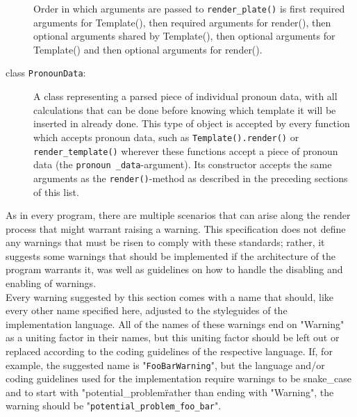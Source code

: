 \documentclass{article}
\newcounter{subsubsubsection}[subsubsection]
\begin{document}
\begin{description}
                                                     Order in which arguments are passed to \texttt{render\_plate()} is first required arguments for Template(), then required arguments for render(), then optional arguments shared by Template(), then optional arguments for Template() and then optional arguments for render().
        \item[class \texttt{PronounData}:] A class representing a parsed piece of individual pronoun data, with all calculations that can be done before knowing which template it will be inserted in already done.
                                            This type of object is accepted by every function which accepts pronoun data, such as \texttt{Template().render()} or \texttt{render\_template()} wherever these functions accept a piece of pronoun data (the \texttt{pronoun \_data}-argument).
                                            Its constructor accepts the same arguments as the  \texttt{render()}-method as described in the preceding sections of this list.
    \end{description}


    As in every program, there are multiple scenarios that can arise along the render process that might warrant raising a warning.
    This specification does not define any warnings that must be risen to comply with these standards;
    rather, it suggests some warnings that should be implemented if the architecture of the program warrants it, was well as guidelines on how to handle the disabling and enabling of warnings.\\

    Every warning suggested by this section comes with a name that should, like every other name specified here, adjusted to the styleguides of the implementation language.
    All of the names of these warnings end on "Warning" as a uniting factor in their names, but this uniting factor should be left out or replaced according to the coding guidelines of the respective language.
    If, for example, the suggested name is "\texttt{FooBarWarning}", but the language and/or coding guidelines used for the implementation require warnings to be snake\_case and to start with "potential\_problem\" rather than ending with "Warning", the warning should be "\texttt{potential\_problem\_foo\_bar}".\\
\end{document}
